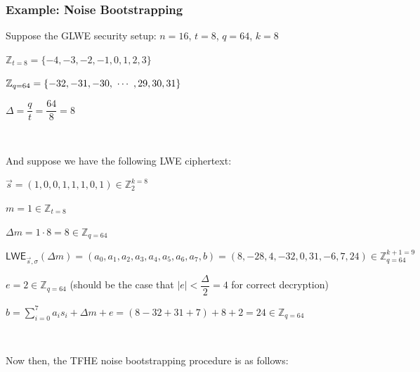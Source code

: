 \subsubsection{Example: Noise Bootstrapping}
\label{subsec:tfhe-noise-bootstrapping-ex}

Suppose the GLWE security setup: $n = 16$, $t = 8$, $q = 64$, $k = 8$

$\mathbb{Z}_{t=8} = \{-4, -3, -2, -1, 0 , 1, 2, 3\}$

$\mathbb{Z}_{q=64} = \{ -32, -31, -30, \text{ } \text{$\cdots$} \text{ }, 29, 30, 31 \}$

$\Delta = \dfrac{q}{t} = \dfrac{64}{8} = 8$

$ $

And suppose we have the following LWE ciphertext:

$\vec{s} = (1, 0, 0, 1, 1, 1, 0, 1) \in \mathbb{Z}_2^{k=8}$

$m = 1  \in \mathbb{Z}_{t=8}$

$\Delta m = 1 \cdot 8 = 8 \in \mathbb{Z}_{q=64}$



$\textsf{LWE}_{\vec{s}, \sigma}(\Delta m) = (a_0, a_1, a_2, a_3, a_4, a_5, a_6, a_7, b) 
= (8, -28, 4, -32, 0, 31, -6, 7, 24) \in \mathbb{Z}_{q=64}^{k+1=9}$

$e = 2 \in \mathbb{Z}_{q=64}$ (should be the case that $|e| < \dfrac{\Delta}{2} = 4$ for correct decryption)

$b = \sum\limits_{i=0}^{7}a_is_i + \Delta m + e = (8 -32 + 31 +7) + 8 + 2 = 24 \in \mathbb{Z}_{q=64}$

$ $

Now then, the TFHE noise bootstrapping procedure is as follows:

$ $

